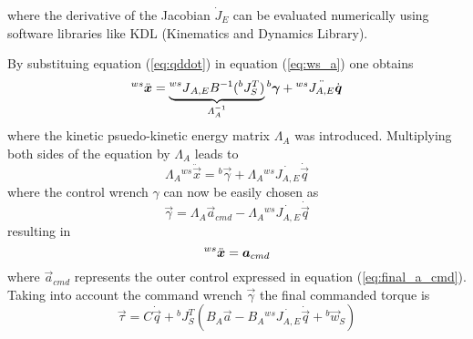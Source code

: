 where the derivative of the Jacobian $\dot{J}_{E}$ can be evaluated numerically
using software libraries like KDL (Kinematics and Dynamics Library).
\par
By substituing equation (\ref{eq:qddot}) in equation (\ref{eq:ws_a}) one obtains
\[
\prescript{ws}{}{\ddot{\vec{x}}} = \underbrace{\prescript{ws}{}{J}_{A,E} B^{-1} ({}^b J_{S}^T)}_{\Lambda_A^{-1}} {}^b \vec{\gamma} + {}^{ws} \ddot{J_{A,E}} \dot{\vec{q}}
\]
where the kinetic psuedo-kinetic energy matrix $\Lambda_{A}$ was introduced. Multiplying both sides of the equation
by $\Lambda_{A}$ leads to
\[
\Lambda_A {}^{ws} \ddot{\vec{x}} =  {}^b \vec{\gamma} +  \Lambda_A  {}^{ws} \dot{J_{A,E}} \dot{\vec{q}}
\]
where the control wrench $\gamma$ can now be easily chosen as
\[\label{eq:gamma}
\vec{\gamma} = \Lambda_A \vec{a}_{cmd} - \Lambda_A {}^{ws} \dot{J_{A,E}} \dot{\vec{q}}
\]
resulting in
\[
\prescript{ws}{}{\ddot{\vec{x}}} = \vec{a}_{cmd}
\]
where $\vec{a}_{cmd}$ represents the outer control expressed in equation (\ref{eq:final_a_cmd}).
Taking into account the command wrench $\vec{\gamma}$ the final commanded torque is
\begin{equation}\label{eq:torque_wo_null}
  \vec{\tau} = C \dot{\vec{q}} + {}^{b}J^{T}_{S} ( B_A \vec{a} - B_A {}^{ws} \dot{J_{A,E}} \dot{\vec{q}} + {}^b\vec{w}_{S})
\end{equation}

